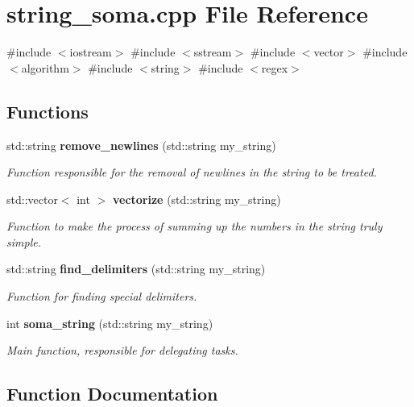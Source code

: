 \section{string\+\_\+soma.\+cpp File Reference}
\label{string__soma_8cpp}
{\ttfamily \#include $<$iostream$>$}\newline
{\ttfamily \#include $<$sstream$>$}\newline
{\ttfamily \#include $<$vector$>$}\newline
{\ttfamily \#include $<$algorithm$>$}\newline
{\ttfamily \#include $<$string$>$}\newline
{\ttfamily \#include $<$regex$>$}\newline
\subsection*{Functions}
\begin{DoxyCompactItemize}
\item 
std\+::string \textbf{ remove\+\_\+newlines} (std\+::string my\+\_\+string)
\begin{DoxyCompactList}\small\item\em Function responsible for the removal of newlines in the string to be treated. \end{DoxyCompactList}\item 
std\+::vector$<$ int $>$ \textbf{ vectorize} (std\+::string my\+\_\+string)
\begin{DoxyCompactList}\small\item\em Function to make the process of summing up the numbers in the string truly simple. \end{DoxyCompactList}\item 
std\+::string \textbf{ find\+\_\+delimiters} (std\+::string my\+\_\+string)
\begin{DoxyCompactList}\small\item\em Function for finding special delimiters. \end{DoxyCompactList}\item 
int \textbf{ soma\+\_\+string} (std\+::string my\+\_\+string)
\begin{DoxyCompactList}\small\item\em Main function, responsible for delegating tasks. \end{DoxyCompactList}\end{DoxyCompactItemize}


\subsection{Function Documentation}
\mbox{\label{string__soma_8cpp_ae5a739a193de257232d3345bf0401006}} 
